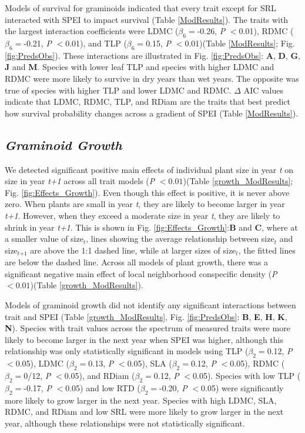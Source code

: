 \documentclass[12pt, letterpaper]{article}
\begin{document}
Models of survival for graminoids indicated that every trait except for SRL interacted with SPEI to impact survival (Table \ref{ModResults}). The traits with the largest interaction coefficients were LDMC ($\beta _6=$-0.26,  \textit{P} $<$0.01), RDMC ($\beta _6=$-0.21,  \textit{P} $<$0.01), and TLP ($\beta _6=$0.15,  \textit{P} $<$0.01)(Table \ref{ModResults}; Fig. \ref{fig:PredsObs}). These interactions are illustrated in Fig. \ref{fig:PredsObs}: \textbf{A}, \textbf{D}, \textbf{G}, \textbf{J} and \textbf{M}. Species with lower leaf TLP and species with higher LDMC and RDMC were more likely to survive in dry years than wet years. The opposite was true of species with higher TLP and lower LDMC and RDMC. $\Delta$ AIC values indicate that LDMC, RDMC, TLP, and RDiam are the traits that best predict how survival probability changes across a gradient of SPEI (Table \ref{ModResults}). 

\subsection{\textit{Graminoid Growth}} 
We detected significant positive main effects of individual plant size in year \textit{t} on size in year \textit{t+1} across all trait models (\textit{P} $<0.01$)(Table \ref{growth_ModResults}; Fig. \ref{fig:Effects_Growth}). Even though this effect is positive, it is never above zero. When plants are small in year \textit{t}, they are likely to become larger in year \textit{t+1}. However, when they exceed a moderate size in year \textit{t}, they are likely to shrink in year \textit{t+1}. This is shown in Fig. \ref{fig:Effects_Growth}:\textbf{B} and \textbf{C}, where at a smaller value of size$_{\textit{t}}$, lines showing the average relationship between size$_{\textit{t}}$ and size$_{\textit{t+1}}$ are above the 1:1 dashed line, while at larger sizes of size$_{\textit{t}}$, the fitted lines are below the dashed line. Across all models of plant growth, there was a significant negative main effect of local neighborhood conspecific density (\textit{P} $<0.01$)(Table \ref{growth_ModResults}).  
 
Models of graminoid growth did not identify any significant interactions between trait and SPEI (Table \ref{growth_ModResults}, Fig. \ref{fig:PredsObs}: \textbf{B}, \textbf{E}, \textbf{H}, \textbf{K}, \textbf{N}). Species with trait values across the spectrum of measured traits were more likely to become larger in the next year when SPEI was higher, although this relationship was only statistically significant in models using TLP ($\beta _2=$0.12,  \textit{P} $<$0.05), LDMC ($\beta _2=$0.13,  \textit{P} $<$0.05), SLA ($\beta _2=$0.12,  \textit{P} $<$0.05), RDMC ($\beta _2=$0/12, \textit{P} $<$0.05), and RDiam ($\beta _2=$0.12,  \textit{P} $<$0.05). Species with low TLP ($\beta _2=$-0.17,  \textit{P} $<$0.05) and low RTD ($\beta _2=$-0.20, \textit{P} $<$0.05) were significantly more likely to grow larger in the next year. Species with high LDMC, SLA, RDMC, and RDiam and low SRL were more likely to grow larger in the next year, although these relationships were not statistically significant.  
\end{document}
